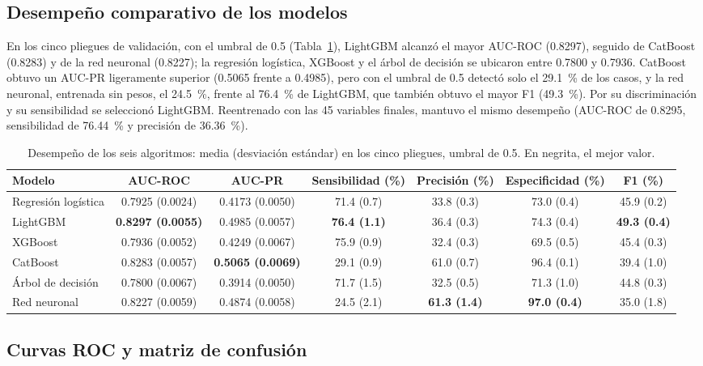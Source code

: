 \documentclass[final,5p,times,twocolumn,number,lefttitle]{elsarticle}
\begin{document}
\subsection{Desempeño comparativo de los modelos}

En los cinco pliegues de validación, con el umbral de 0.5 (Tabla~\ref{tab:modelos}), LightGBM alcanzó el mayor AUC-ROC (0.8297), seguido de CatBoost (0.8283) y de la red neuronal (0.8227); la regresión logística, XGBoost y el árbol de decisión se ubicaron entre 0.7800 y 0.7936. CatBoost obtuvo un AUC-PR ligeramente superior (0.5065 frente a 0.4985), pero con el umbral de 0.5 detectó solo el 29.1~\% de los casos, y la red neuronal, entrenada sin pesos, el 24.5~\%, frente al 76.4~\% de LightGBM, que también obtuvo el mayor F1 (49.3~\%). Por su discriminación y su sensibilidad se seleccionó LightGBM. Reentrenado con las 45 variables finales, mantuvo el mismo desempeño (AUC-ROC de 0.8295, sensibilidad de 76.44~\% y precisión de 36.36~\%).

\begin{table}[!tp]
\centering
\caption{Desempeño de los seis algoritmos: media (desviación estándar) en los cinco pliegues, umbral de 0.5. En negrita, el mejor valor.}
\label{tab:modelos}
\begin{tabular}{lcccccc}
\hline
Modelo & AUC-ROC & AUC-PR & Sensibilidad (\%) & Precisión (\%) & Especificidad (\%) & F1 (\%) \\
\hline
Regresión logística & 0.7925 (0.0024) & 0.4173 (0.0050) & 71.4 (0.7) & 33.8 (0.3) & 73.0 (0.4) & 45.9 (0.2) \\
LightGBM & \textbf{0.8297 (0.0055)} & 0.4985 (0.0057) & \textbf{76.4 (1.1)} & 36.4 (0.3) & 74.3 (0.4) & \textbf{49.3 (0.4)} \\
XGBoost & 0.7936 (0.0052) & 0.4249 (0.0067) & 75.9 (0.9) & 32.4 (0.3) & 69.5 (0.5) & 45.4 (0.3) \\
CatBoost & 0.8283 (0.0057) & \textbf{0.5065 (0.0069)} & 29.1 (0.9) & 61.0 (0.7) & 96.4 (0.1) & 39.4 (1.0) \\
Árbol de decisión & 0.7800 (0.0067) & 0.3914 (0.0050) & 71.7 (1.5) & 32.5 (0.5) & 71.3 (1.0) & 44.8 (0.3) \\
Red neuronal & 0.8227 (0.0059) & 0.4874 (0.0058) & 24.5 (2.1) & \textbf{61.3 (1.4)} & \textbf{97.0 (0.4)} & 35.0 (1.8) \\
\hline
\end{tabular}
\end{table}

\subsection{Curvas ROC y matriz de confusión}
\end{document}
